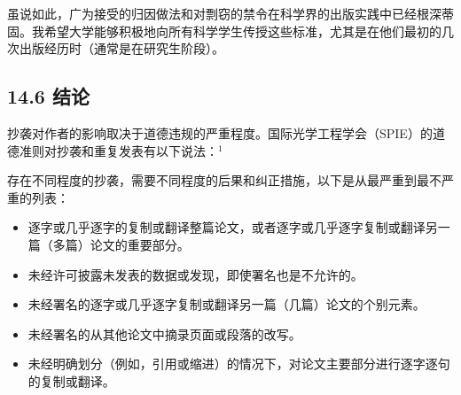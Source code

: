 虽说如此，广为接受的归因做法和对剽窃的禁令在科学界的出版实践中已经根深蒂固。我希望大学能够积极地向所有科学学生传授这些标准，尤其是在他们最初的几次出版经历时（通常是在研究生阶段）。

\subsection*{14.6 结论}
抄袭对作者的影响取决于道德违规的严重程度。国际光学工程学会（SPIE）的道德准则对抄袭和重复发表有以下说法：${ }^{1}$

存在不同程度的抄袭，需要不同程度的后果和纠正措施，以下是从最严重到最不严重的列表：

\begin{itemize}
\item 逐字或几乎逐字的复制或翻译整篇论文，或者逐字或几乎逐字复制或翻译另一篇（多篇）论文的重要部分。
\item 未经许可披露未发表的数据或发现，即使署名也是不允许的。
\item 未经署名的逐字或几乎逐字复制或翻译另一篇（几篇）论文的个别元素。
\item 未经署名的从其他论文中摘录页面或段落的改写。
\item 未经明确划分（例如，引用或缩进）的情况下，对论文主要部分进行逐字逐句的复制或翻译。
\end{itemize}

